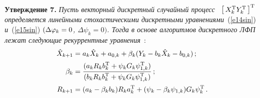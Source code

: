 \begin{multicols}{2}
\smallskip

\noindent
\textbf{Утверждение 7.}
\textit{Пусть векторный дискретный случайный процесс~ $\left[\, X_k^{\mathrm{T}} Y_k^{\mathrm{T}}\,\right]^{\mathrm{T}}$ определяется 
линейными стохастическими дискретными уравнениями}~(\ref{e14sin}) \textit{и}~(\ref{e15sin})  
\textit{$(\Delta \varphi_k=0$, $\Delta \psi_k=0)$. Тогда в основе алгоритмов дискретного 
ЛФП лежат следующие рекуррентные уравнения}~\cite{4sin}:
\begin{align*}
\hat X_{k+1} &=a_k \hat X_k + a_{0,k} +\beta_k (Y_k - b_k \hat X_k - b_{0,k})\,; %
\\[1pt]
\beta_k &= \fr{(a_k R_k b_k^{\mathrm{T}} +\psi_k G_k \psi_{1,k}^{\mathrm{T}})}{ 
(b_k R_k b_k^{\mathrm{T}} + \psi_k G_k \psi_{1,k}^{\mathrm{T}})}\,; %
\\[1pt]
R_{k+1} &= (a_k -\beta_k b_k) R_k a_k^{\mathrm{T}} + (\psi_k - \beta_k \psi_{1,k}) G_k \psi_k^{\mathrm{T}}\,. %
\end{align*}

\smallskip


\end{multicols}
